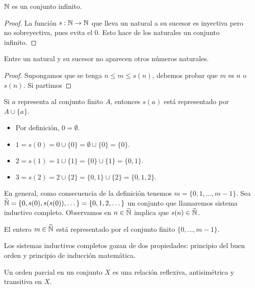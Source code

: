 \documentclass[main.tex]{subfiles}
\begin{document}
\begin{theorem}
    $\mathbb N$ es un conjunto infinito.
\end{theorem}

\begin{proof}
    La funci\'on $s: \mathbb N \to \mathbb N$ que lleva un natural a su sucesor es inyectiva pero no sobreyectiva, pues evita el $0$. Esto hace de los naturales un conjunto infinito.
\end{proof}

\begin{theorem}
    Entre un natural y su sucesor no aparecen otros n\'umeros naturales.
\end{theorem}

\begin{proof}
    Supongamos que se tenga $n \leq m \leq s(n)$, debemos probar que $m$ es $n$ o $s(n)$. Si partimos
\end{proof}

Si $a$ representa al conjunto finito $A$, entonces $s(a)$ est\'a representado por $A \cup \{a\}$.
\begin{itemize}
    \item Por definici\'on, $0 = \emptyset$.
    \item $1 = s(0) = 0 \cup \{0\} = \emptyset \cup \{0\} = \{0\}.$
    \item $2 = s(1) = 1 \cup \{1\} = \{0\} \cup \{1\} = \{0, 1\}.$
    \item $3 = s(2) = 2 \cup \{2\} = \{0, 1\} \cup \{2\} = \{0, 1, 2\}.$
\end{itemize}
En general, como consecuencia de la definici\'on tenemos $m = \{0, 1, \dots , m - 1\}.$
Sea $\widetilde{\mathbb N} = \{0, s(0), s(s(0)), \dots\} = \{0, 1, 2, \dots\}$ un conjunto que llamaremos sistema inductivo completo. Observamos en $n \in \widetilde{\mathbb N}$ implica que $s(n) \in \widetilde{\mathbb N}$.

\begin{lemma}
    El entero $m \in \widetilde{\mathbb N}$ est\'a representado por el conjunto finito $\{0, \dots, m - 1\}$.
\end{lemma}

Los sistemas inductivos completos gozan de dos propiedades: principio del buen orden y principio de inducci\'on matem\'atica.

\begin{defn}
    Un orden parcial en un conjunto $X$ es una relaci\'on reflexiva, antisim\'etrica y transitiva en $X$.
\end{defn}
\end{document}

